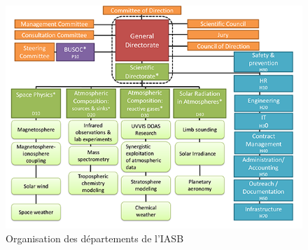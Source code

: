 \documentclass[11pt]{article}
\begin{document}
\begin{figure}[t]
    \begin{center}
        \includegraphics[scale=0.5]{organization.png}
        \caption{Organisation des départements de l'IASB}
    \end{center}
\end{figure}
\end{document}
